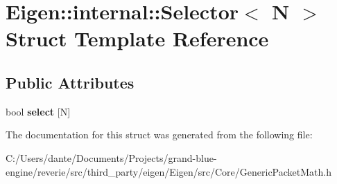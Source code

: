 \hypertarget{struct_eigen_1_1internal_1_1_selector}{}\section{Eigen\+::internal\+::Selector$<$ N $>$ Struct Template Reference}
\label{struct_eigen_1_1internal_1_1_selector}
\subsection*{Public Attributes}
\begin{DoxyCompactItemize}
\item 
\mbox{\label{struct_eigen_1_1internal_1_1_selector_a66f98a6fcfbb8d99adeed205aaf6fcbc}} 
bool {\bfseries select} \mbox{[}N\mbox{]}
\end{DoxyCompactItemize}


The documentation for this struct was generated from the following file\+:\begin{DoxyCompactItemize}
\item 
C\+:/\+Users/dante/\+Documents/\+Projects/grand-\/blue-\/engine/reverie/src/third\+\_\+party/eigen/\+Eigen/src/\+Core/Generic\+Packet\+Math.\+h\end{DoxyCompactItemize}
